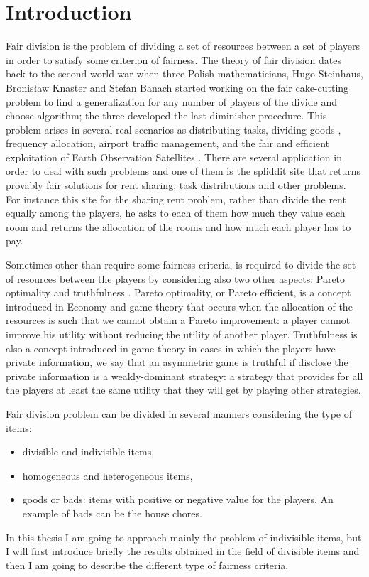 \chapter{Introduction}
Fair division is the problem of dividing a set of resources between a set of players in order to satisfy some criterion of fairness. The theory of fair division dates back to the second world war when three Polish mathematicians, Hugo Steinhaus, Bronisław Knaster and Stefan Banach started working on the fair cake-cutting problem to find a generalization for any number of players of the divide and choose algorithm; the three developed the last diminisher procedure.
This problem arises in several real scenarios as distributing tasks, dividing goods \cite{DBLP:GhodsiHSSY18-real-scenarios}, frequency allocation, airport traffic management, and the fair and efficient exploitation of Earth Observation Satellites \cite{real-scenarios-2}. There are several application in order to deal with such problems and one of them is the \href{http://www.spliddit.org/}{spliddit} site that returns provably fair solutions for rent sharing, task distributions and other problems. For instance this site for the sharing rent problem, rather than divide the rent equally among the players, he asks to each of them how much they value each room and returns the allocation of the rooms and how much each player has to pay. 

Sometimes other than require some fairness criteria, is required to divide the set of resources between the players by considering also two other aspects: Pareto optimality and truthfulness \cite{wiki-fair-division}. Pareto optimality, or Pareto efficient,  is a concept introduced in Economy and game theory that occurs when the allocation of the resources is such that we cannot obtain a Pareto improvement: a player cannot improve his utility without reducing the utility of another player. Truthfulness is also a concept introduced in game theory in cases in which the players have private information, we say that an asymmetric game is truthful if disclose the private information is a weakly-dominant strategy: a strategy that provides for all the players at least the same utility that they will get by playing other strategies.

Fair division problem can be divided in several manners considering the type of items:
\begin{itemize}
    \item divisible and indivisible items,
    \item homogeneous and heterogeneous items,
    \item goods or bads: items with positive or negative value for the players. An example of bads can be the house chores.
\end{itemize}
In this thesis I am going to approach mainly the problem of indivisible items, but I will first introduce briefly the results obtained in the field of divisible items and then I am going to describe the different type of fairness criteria. 

